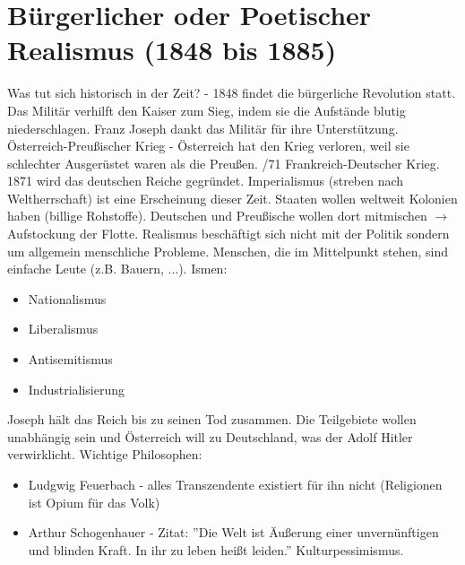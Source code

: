 \documentclass[a4paper]{report}
\begin{document}
\chapter{Bürgerlicher oder Poetischer Realismus (1848 bis 1885)}

Was tut sich historisch in der Zeit? - 1848 findet die bürgerliche Revolution statt. Das Militär verhilft den Kaiser zum Sieg, indem sie die Aufstände blutig niederschlagen. Franz Joseph dankt das Militär für ihre Unterstützung. 
\newline
\newline
Österreich-Preußischer Krieg - Österreich hat den Krieg verloren, weil sie schlechter Ausgerüstet waren als die Preußen.
\newline
{}/71 Frankreich-Deutscher Krieg.
1871 wird das deutschen Reiche gegründet.
Imperialismus (streben nach Weltherrschaft) ist eine Erscheinung dieser Zeit. Staaten wollen weltweit Kolonien haben (billige Rohstoffe). Deutschen und Preußische wollen dort mitmischen $\rightarrow$ Aufstockung der Flotte.
\newline
\newline
Realismus beschäftigt sich nicht mit der Politik sondern um allgemein menschliche Probleme. Menschen, die im Mittelpunkt stehen, sind einfache Leute (z.B. Bauern, ...).
\newline
\newline
Ismen:
\begin{itemize}
\item Nationalismus
\item Liberalismus
\item Antisemitismus
\item Industrialisierung
\end{itemize}

Joseph hält das Reich bis zu seinen Tod zusammen. Die Teilgebiete wollen unabhängig sein und Österreich will zu Deutschland, was der Adolf Hitler verwirklicht.
\newline
\newline
Wichtige Philosophen:
\begin{itemize}
\item Ludgwig Feuerbach - alles Transzendente existiert für ihn nicht (Religionen ist Opium für das Volk)
\item Arthur Schogenhauer - Zitat: ''Die Welt ist Äußerung einer unvernünftigen und  blinden Kraft. In ihr zu leben heißt leiden.'' Kulturpessimismus.
\end{itemize}
\end{document}
